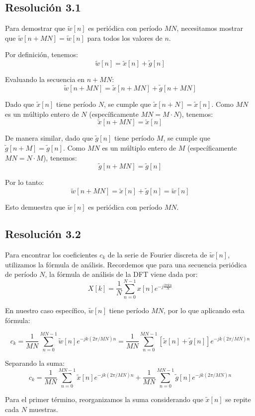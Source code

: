\documentclass[
  11pt,
  letterpaper,
   addpoints,
   answers
  ]{exam}
\begin{document}
\begin{questions}
\begin{solution}
\subsection*{Resolución 3.1}
Para demostrar que $\tilde{w}[n]$ es periódica con período $MN$, necesitamos mostrar que $\tilde{w}[n + MN] = \tilde{w}[n]$ para todos los valores de $n$.

Por definición, tenemos:
$$\tilde{w}[n] = \tilde{x}[n] + \tilde{g}[n]$$

Evaluando la secuencia en $n + MN$:
$$\tilde{w}[n + MN] = \tilde{x}[n + MN] + \tilde{g}[n + MN]$$

Dado que $\tilde{x}[n]$ tiene período $N$, se cumple que $\tilde{x}[n + N] = \tilde{x}[n]$. Como $MN$ es un múltiplo entero de $N$ (específicamente $MN = M \cdot N$), tenemos:
$$\tilde{x}[n + MN] = \tilde{x}[n]$$

De manera similar, dado que $\tilde{g}[n]$ tiene período $M$, se cumple que $\tilde{g}[n + M] = \tilde{g}[n]$. Como $MN$ es un múltiplo entero de $M$ (específicamente $MN = N \cdot M$), tenemos:
$$\tilde{g}[n + MN] = \tilde{g}[n]$$

Por lo tanto:
$$\tilde{w}[n + MN] = \tilde{x}[n] + \tilde{g}[n] = \tilde{w}[n]$$

Esto demuestra que $\tilde{w}[n]$ es periódica con período $MN$.

\subsection*{Resolución 3.2}
Para encontrar los coeficientes $c_k$ de la serie de Fourier discreta de $\tilde{w}[n]$, utilizamos la fórmula de análisis. Recordemos que para una secuencia periódica de período $N$, la fórmula de análisis de la DFT viene dada por:
$$X[k] = \frac{1}{N}\sum_{n=0}^{N-1} x[n]e^{-j\frac{2\pi kn}{N}}$$

En nuestro caso específico, $\tilde{w}[n]$ tiene período $MN$, por lo que aplicando esta fórmula:


$$c_k = \frac{1}{MN} \sum_{n=0}^{MN-1} \tilde{w}[n]e^{-jk(2\pi/MN)n} = \frac{1}{MN} \sum_{n=0}^{MN-1} [\tilde{x}[n] + \tilde{g}[n]]e^{-jk(2\pi/MN)n}$$

Separando la suma:
$$c_k = \frac{1}{MN} \sum_{n=0}^{MN-1} \tilde{x}[n]e^{-jk(2\pi/MN)n} + \frac{1}{MN} \sum_{n=0}^{MN-1} \tilde{g}[n]e^{-jk(2\pi/MN)n}$$

Para el primer término, reorganizamos la suma considerando que $\tilde{x}[n]$ se repite cada $N$ muestras. 


\end{solution}
\end{questions}
\end{document}
